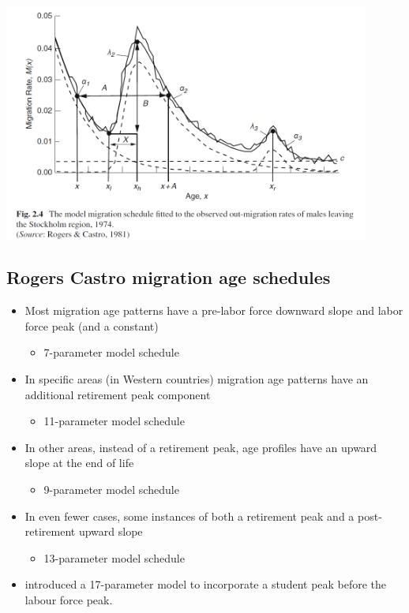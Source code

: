 \documentclass[
]{book}
\providecommand{\tightlist}{%
  \setlength{\itemsep}{0pt}\setlength{\parskip}{0pt}}
\begin{document}
\includegraphics[width=0.9\textwidth]{"./img/rc"}

\hypertarget{rogers-castro-migration-age-schedules-3}{%
\subsection{Rogers Castro migration age schedules}\label{rogers-castro-migration-age-schedules-3}}

\begin{itemize}
\tightlist
\item
  Most migration age patterns have a pre-labor force downward slope and labor force peak (and a constant)

  \begin{itemize}
  \tightlist
  \item
    7-parameter model schedule
  \end{itemize}
\item
  In specific areas (in Western countries) migration age patterns have an additional retirement peak component

  \begin{itemize}
  \tightlist
  \item
    11-parameter model schedule
  \end{itemize}
\item
  In other areas, instead of a retirement peak, age profiles have an upward slope at the end of life

  \begin{itemize}
  \tightlist
  \item
    9-parameter model schedule
  \end{itemize}
\item
  In even fewer cases, some instances of both a retirement peak and a post-retirement upward slope \citet{Rogers1987a}

  \begin{itemize}
  \tightlist
  \item
    13-parameter model schedule
  \end{itemize}
\item
  \citet{Wilson2010} introduced a 17-parameter model to incorporate a student peak before the labour force peak.
\end{itemize}
\end{document}
